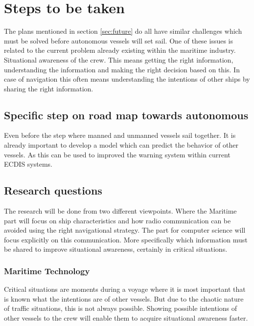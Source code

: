 \chapter{Steps to be taken}
The plans mentioned in section \ref{sec:future} do all have similar challenges which must be solved before autonomous vessels will set sail. One of these issues is related to the current problem already existing within the maritime industry. Situational awareness of the crew. This means getting the right information, understanding the information and making the right decision based on this. In case of navigation this often means understanding the intentions of other ships by sharing the right information.

\section{Specific step on road map towards autonomous}
Even before the step where manned and unmanned vessels sail together. It is already important to develop a model which can predict the behavior of other vessels. As this can be used to improved the warning system within current ECDIS systems. 

\section{Research questions}
The research will be done from two different viewpoints. Where the Maritime part will focus on ship characteristics and how radio communication can be avoided using the right navigational strategy. The part for computer science will focus explicitly on this communication. More specifically which information must be shared to improve situational awareness, certainly in critical situations.

\subsection{Maritime Technology}
Critical situations are moments during a voyage where it is most important that is known what the intentions are of other vessels. But due to the chaotic nature of traffic situations, this is not always possible. Showing possible intentions of other vessels to the crew will enable them to acquire situational awareness faster. 

